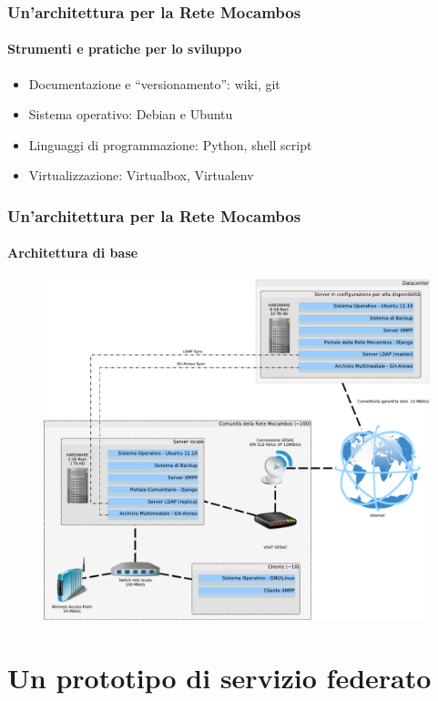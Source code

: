 \documentclass{beamer}
\begin{document}
\begin{frame}
  \frametitle{Un'architettura per la Rete Mocambos}
  \framesubtitle{Strumenti e pratiche per lo sviluppo}
  \begin{itemize}
    \item Documentazione e ``versionamento'': wiki, git
    \item Sistema operativo: Debian e Ubuntu
    \item Linguaggi di programmazione: Python, shell script
    \item Virtualizzazione: Virtualbox, Virtualenv
    \end{itemize}

\end{frame}

\begin{frame}
  \frametitle{Un'architettura per la Rete Mocambos}
  \framesubtitle{Architettura di base}
	\begin{figure}
		\includegraphics[height=0.7\textheight]{./Figure/SchemaServer_ReteMocambos-crop.pdf}
	\end{figure}
\end{frame}

\section{Un prototipo di servizio federato}
\end{document}
